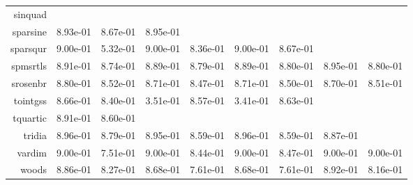 \begin{tabular}{rrrrrrrrr}
  sinquad & \cellcolor{black}{\color{white}{ 8.89e-01}} & \cellcolor{black}{\color{white}{ 8.57e-01}} & \cellcolor{black}{\color{white}{ 8.92e-01}} & \cellcolor{black}{\color{white}{ 8.75e-01}} & \cellcolor{black}{\color{white}{ 8.91e-01}} & \cellcolor{black}{\color{white}{ 8.64e-01}} & \cellcolor{black}{\color{white}{ 8.83e-01}} & \cellcolor{black}{\color{white}{ 8.61e-01}} \\
  sparsine &  8.93e-01 &  8.67e-01 &  8.95e-01 & \cellcolor{black}{\color{white}{ 8.67e-01}} & \cellcolor{black}{\color{white}{ 8.97e-01}} & \cellcolor{black}{\color{white}{ 8.86e-01}} & \cellcolor{black}{\color{white}{ 8.86e-01}} & \cellcolor{black}{\color{white}{ 8.39e-01}} \\
  sparsqur &  9.00e-01 &  5.32e-01 &  9.00e-01 &  8.36e-01 &  9.00e-01 &  8.67e-01 & \cellcolor{black}{\color{white}{ 8.97e-01}} & \cellcolor{black}{\color{white}{ 8.24e-01}} \\
  spmsrtls &  8.91e-01 &  8.74e-01 &  8.89e-01 &  8.79e-01 &  8.89e-01 &  8.80e-01 &  8.95e-01 &  8.80e-01 \\
  srosenbr &  8.80e-01 &  8.52e-01 &  8.71e-01 &  8.47e-01 &  8.71e-01 &  8.50e-01 &  8.70e-01 &  8.51e-01 \\
  tointgss &  8.66e-01 &  8.40e-01 &  3.51e-01 &  8.57e-01 &  3.41e-01 &  8.63e-01 & \cellcolor{black}{\color{white}{ 6.12e-01}} & \cellcolor{black}{\color{white}{ 8.59e-01}} \\
  tquartic &  8.91e-01 &  8.60e-01 & \cellcolor{black}{\color{white}{ 8.91e-01}} & \cellcolor{black}{\color{white}{ 8.57e-01}} & \cellcolor{black}{\color{white}{ 8.91e-01}} & \cellcolor{black}{\color{white}{ 8.58e-01}} & \cellcolor{black}{\color{white}{ 8.91e-01}} & \cellcolor{black}{\color{white}{ 8.60e-01}} \\
  tridia &  8.96e-01 &  8.79e-01 &  8.95e-01 &  8.59e-01 &  8.96e-01 &  8.59e-01 &  8.87e-01 & \cellcolor{black}{\color{white}{ 8.57e-01}} \\
  vardim &  9.00e-01 &  7.51e-01 &  9.00e-01 &  8.44e-01 &  9.00e-01 &  8.47e-01 &  9.00e-01 &  9.00e-01 \\
  woods &  8.86e-01 &  8.27e-01 &  8.68e-01 &  7.61e-01 &  8.68e-01 &  7.61e-01 &  8.92e-01 &  8.16e-01 \\\hline
\end{tabular}
